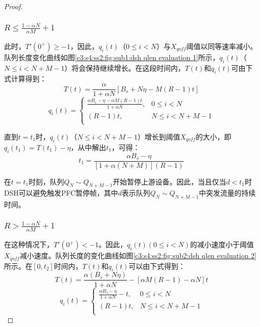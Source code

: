 \begin{proof}
  \setcounter{subsubsection}{0}
  \subsubsection{$R \leqslant \frac{1-\alpha N}{\alpha M} + 1$}

  此时，$T'(0^+) \geqslant -1$，因此，$q_i(t)$（$0 \leqslant i < N$）与$X_{qoff}$阈值以同等速率减小。队列长度变化曲线如图\ref{c3:s4:ss2:fig:sub1:dsh qlen evaluation 1}所示，$q_i(t)$（$N \leqslant i < N + M - 1$）将会保持继续增长。在这段时间内，$T(t)$和$q_i(t)$可由下式计算得到：
  \begin{equation}
    T(t)=\frac{\alpha}{1+\alpha N}[B_s+N\eta-M(R-1)t]
  \end{equation}
  \begin{equation}
    q_i(t)=
    \begin{cases}
      \frac{\alpha B_s-\eta-\alpha M(R-1)t}{1+\alpha N}, 
      & 0 \leqslant i < N \\
      (R-1)t, & N \leqslant i < N + M -1 \\
    \end{cases}
  \end{equation}  

  直到$t=t_1$时，$q_i(t)$（$N \leqslant i < N + M - 1$）增长到阈值$X_{qoff}$的大小，即$q_i(t_1)=T(t_1)-\eta$，从中解出$t_1$，可得：
  \begin{equation}
    t_1=\frac{\alpha B_s - \eta}{[1+\alpha (N+M)](R-1)}
  \end{equation}

  在$t=t_1$时刻，队列$Q_N \sim Q_{N+M-1}$开始暂停上游设备。因此，当且仅当$d<t_1$时DSH可以避免触发PFC暂停帧，其中$d$表示队列$Q_N \sim Q_{N+M-1}$中突发流量的持续时间。

  \subsubsection{$R>\frac{1-\alpha N}{\alpha M}+1$}

  在这种情况下，$T'(0^+)<-1$。因此，$q_i(t)(0 \leqslant i < N)$的减小速度小于阈值$X_{qoff}$减小速度。队列长度的变化曲线如图\ref{c3:s4:ss2:fig:sub2:dsh qlen evaluation 2}所示。在$[0,t_2]$时间内，$T(t)$和$q_i(t)$可以由下式得到：
  \begin{equation}
    T(t)=\frac{\alpha(B_s+N\eta)}{1+\alpha N}-[\alpha M(R-1)-\alpha N]t
  \end{equation}
  \begin{equation}
    q_i(t)=
    \begin{cases}
      \frac{\alpha B_s-\eta}{1+\alpha N}-t, 
      & 0 \leqslant i < N \\
      (R-1)t, & N \leqslant i < N + M -1 \\
    \end{cases}
  \end{equation}


\end{proof}
